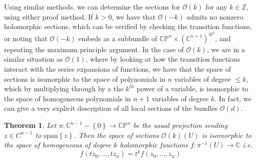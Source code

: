 \documentclass[psamsfonts, 12pt]{amsart}
\newtheorem{thm}{Theorem}[section]
\theoremstyle{definition}
\theoremstyle{remark}
\renewcommand{\O}{\mathcal{O}}
\newcommand{\Z}{\mathbb{Z}}
\newcommand{\C}{\mathbb{C}}
\newcommand{\CP}{\mathbb{CP}}
\newcommand{\inv}{^{-1}}
\newcommand{\set}[1]{\left\lbrace #1 \right\rbrace}
\begin{document}
%
Using similar methods, we can determine the sections for $\O(k)$ for any
$k \in \Z$, using either proof method. If $k > 0$, we have that
$\O(-k)$ admits no nonzero holomorphic sections, which can be verified by checking the
transition functions, or noting that $\O(-k)$ embeds as a subbundle of
$\CP^n \times (\C^{n+1})^{\otimes^k}$, and repeating the maximum principle argument.
In the case of $\O(k)$, we are in a similar situation as $\O(1)$, where by
looking at how the transition functions interact with the series expansions of
functions, we have that the space of sections is isomorphic to the
space of polynomials in $n$ variables of degree $\leq k$, which by multiplying through
by a the $k^{th}$ power of a variable, is isomorphic to the space of homogeneous
polynomials in $n+1$ variables of degree $k$. In fact, we can give a very explicit
description of all local sections of the bundles $\O(d)$.
%
\begin{thm}
Let $\pi : \C^{n-1} - \set{0} \to \CP^n$ be the usual projection sending
$z \in C^{n-1}$ to $\mathrm{span}\set{z}$. Then the space of sections
$\O(k)(U)$ is isomorphic to the space of homogeneous of degree $k$  holomorphic functions
$f : \pi\inv(U) \to \C$ i.e.
\[
f(tz_0, \ldots, tz_n) = t^kf(z_0,\ldots, z_n)
\]
\end{thm}
%
\end{document}
